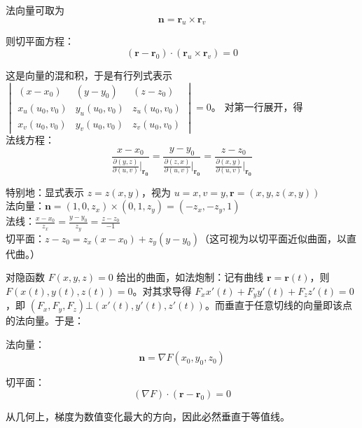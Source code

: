 \documentclass[12pt, a4paper, UTF8, openany]{ctexbook}
\newcommand{\mat}[1]{\mathbf{#1}}
\begin{document}
        法向量可取为
        $$\mat{n} = \mat{r}_u \times \mat{r}_v$$
        
        则切平面方程：
        $$(\mat{r} - \mat{r}_0) \cdot (\mat{r}_u \times \mat{r}_v) = 0$$
        
        这是向量的混和积，于是有行列式表示 $\begin{vmatrix}
            (x - x_0) & (y - y_0) & (z - z_0) \\ 
            x_u (u_0, v_0) & y_u (u_0, v_0) & z_u (u_0, v_0) \\
            x_v (u_0, v_0) & y_v (u_0, v_0) & z_v (u_0, v_0)
        \end{vmatrix} = 0$。
        对第一行展开，得 \\
        法线方程：
        $$\dfrac{x - x_0}{\frac{\partial (y, z)}{\partial (u, v)}|_{\mat{r_0}}} = \dfrac{y - y_0}{\frac{\partial (z, x)}{\partial (u, v)}|_{\mat{r_0}}} = \dfrac{z - z_0}{\frac{\partial (x, y)}{\partial (u, v)}|_{\mat{r_0}}}$$

        {\heiti 特别地}：显式表示 $z = z(x, y)$，视为 $u = x, v = y, \mat{r} = (x, y, z(x, y))$ \\
        法向量：$\mat{n} = (1, 0, z_x) \times (0, 1, z_y) = (-z_x, -z_y, 1)$ \\
        法线：$\frac{x - x_0}{z_x} = \frac{y - y_0}{z_y} = \frac{z - z_0}{-1}$ \\
        切平面：$z - z_0 = z_x(x - x_0) + z_y(y - y_0)$（这可视为以切平面近似曲面，以直代曲。）

        对隐函数 $F(x, y, z) = 0$ 给出的曲面，如法炮制：记有曲线 $\mat{r} = \mat{r}(t)$，则 $F(x(t), y(t), z(t)) = 0$。对其求导得 $F_x x'(t) + F_y y'(t) + F_z z'(t) = 0$，即 $(F_x, F_y, F_z) \bot (x'(t), y'(t), z'(t))$。而垂直于任意切线的向量即该点的法向量。于是：

        法向量：
        $$\mat{n} = \nabla F (x_0, y_0, z_0)$$

        切平面：
        $$(\nabla F) \cdot (\mat{r} - \mat{r}_0) = 0$$

        从几何上，梯度为数值变化最大的方向，因此必然垂直于等值线。
\end{document}
